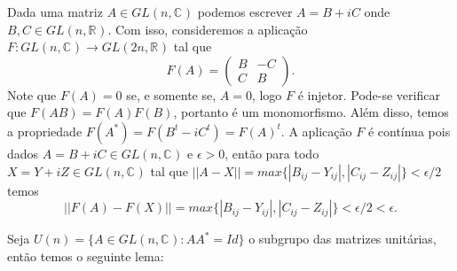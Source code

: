 \documentclass[12pt]{book}
\newcommand{\complexo}[1]{\mathbb{C}^{#1}}
\newcommand{\generalgroup}[2]{GL(#1, #2)}
\newcommand{\generalgroupreal}[1]{\generalgroup{#1}{\real{}}}
\newcommand{\generalgroupcomplexo}[1]{\generalgroup{#1}{\complexo{}}}
\newcommand{\matrizunitaria}[1]{U(#1)}
\newcommand{\real}[1]{\mathbb{R}^{#1}}
\begin{document}
	Dada uma matriz $A \in \generalgroupcomplexo{n}$ podemos escrever $A = B+iC$ onde $B,C \in \generalgroupreal{n}$. Com isso, consideremos a aplicação $F:\generalgroupcomplexo{n} \to \generalgroupreal{2n}$ tal que 
	$$
	F(A)=
	\left(
	\begin{array}{cc}
	B & -C
	\\
	C & B
	\end{array}
	\right).
	$$
	Note que $F(A) = 0$ se, e somente se, $A=0$, logo $F$ é injetor. Pode-se verificar que $F(AB)=F(A)F(B)$, portanto é um monomorfismo. Além disso, temos a propriedade $F(A^{*}) = F(B^{t} - iC^{t}) = F(A)^{t}$. A aplicação $F$ é contínua pois dados $A=B+iC \in \generalgroupcomplexo{n}$ e $\epsilon > 0$, então para todo $X= Y+iZ \in \generalgroupcomplexo{n}$ tal que $||A - X||=max \{|B_{ij} - Y_{ij}|,  |C_{ij} - Z_{ij}|\} < \epsilon/2$ temos
	$$
	||F(A) - F(X)|| = max \{|B_{ij} - Y_{ij}|, |C_{ij} - Z_{ij}| \}< \epsilon/2 < \epsilon.
	$$

	Seja $\matrizunitaria{n} = \{A\in \generalgroupcomplexo{n}: AA^{*}=Id \}$ o subgrupo das matrizes unitárias, então temos o seguinte lema:
	
\end{document}
